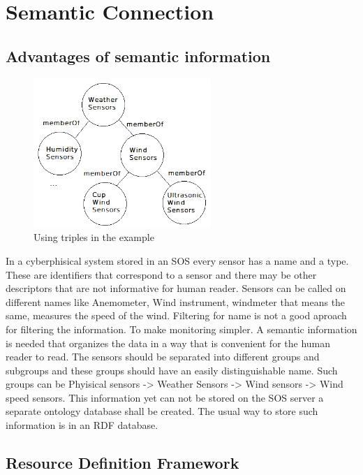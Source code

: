 \chapter{Semantic Connection}

\section{Advantages of semantic information}

\begin{figure}[h]
\centering
\includegraphics[width=0.6\textwidth]{figures/semws.png}
\caption{Using triples in the example\label{fig:semws}}
\end{figure}

In a cyberphisical system stored in an SOS every sensor has a name and a type. These are identifiers that correspond to a sensor and there may be other descriptors that are not informative for human reader. Sensors can be called on different names like Anemometer, Wind instrument, windmeter that means the same, measures the speed of the wind. Filtering for name is not a good aproach for filtering the information. To make monitoring simpler. A semantic information is needed that organizes the data in a way that is convenient for the human reader to read. The sensors should be separated into different groups and subgroups and these groups should have an easily distinguishable name. Such groups can be Phyisical sensors -> Weather Sensors -> Wind sensors -> Wind speed sensors. This information yet can not be stored on the SOS server a separate ontology database shall be created. The usual way to store such information is in an RDF database.

\section{Resource Definition Framework}

